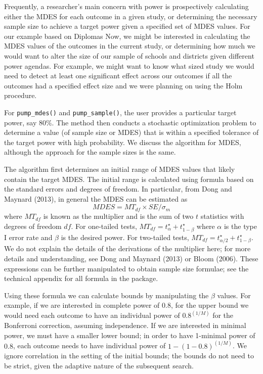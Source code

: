 \documentclass[
]{article}
\begin{document}
Frequently, a researcher's main concern with power is prospectively
calculating either the MDES for each outcome in a given study, or
determining the necessary sample size to achieve a target power given a
specified set of MDES values. For our example based on Diplomas Now, we
might be interested in calculating the MDES values of the outcomes in
the current study, or determining how much we would want to alter the
size of our sample of schools and districts given different power
agendas. For example, we might want to know what sized study we would
need to detect at least one significant effect across our outcomes if
all the outcomes had a specified effect size and we were planning on
using the Holm procedure.

For \texttt{pump\_mdes()} and \texttt{pump\_sample()}, the user provides
a particular target power, say \(80\%\). The method then conducts a
stochastic optimization problem to determine a value (of sample size or
MDES) that is within a specified tolerance of the target power with high
probability. We discuss the algorithm for MDES, although the approach
for the sample sizes is the same.

The algorithm first determines an initial range of MDES values that
likely contain the target MDES. The initial range is calculated using
formula based on the standard errors and degrees of freedom. In
particular, from Dong and Maynard (2013), in general the MDES can be
estimated as \[ MDES = MT_{df} \times SE / \sigma_{m} \] where
\(MT_{df}\) is known as the multiplier and is the sum of two \(t\)
statistics with degrees of freedom \(df\). For one-tailed tests,
\(MT_{df} = t_{\alpha}^\star + t_{1-\beta}^\star\) where \(\alpha\) is
the type I error rate and \(\beta\) is the desired power. For two-tailed
tests, \(MT_{df} = t_{\alpha/2}^\star + t_{1-\beta}^\star\). We do not
explain the details of the derivations of the multiplier here; for more
details and understanding, see Dong and Maynard (2013) or Bloom (2006).
These expressions can be further manipulated to obtain sample size
formulae; see the technical appendix for all formula in the package.

Using these formula we can calculate bounds by manipulating the
\(\beta\) values. For example, if we are interested in complete power of
\(0.8\), for the upper bound we would need each outcome to have an
individual power of \(\text{0.8}^{(1/M)}\) for the Bonferroni
correction, assuming independence. If we are interested in minimal
power, we must have a smaller lower bound; in order to have 1-minimal
power of \(0.8\), each outcome needs to have individual power of
\(1 - (1 - \text{0.8})^{(1/M)}\). We ignore correlation in the setting
of the initial bounds; the bounds do not need to be strict, given the
adaptive nature of the subsequent search.
\end{document}
